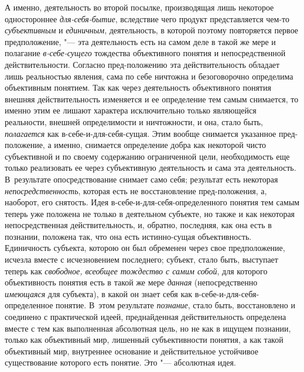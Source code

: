 А именно, деятельность во второй посылке, производящая лишь
некоторое одностороннее
{\em для-себя-бытие},
вследствие чего продукт представляется чем-то
{\em субъективным} и
{\em единичным},
деятельность, в которой поэтому повторяется первое
предположение, "--- эта деятельность есть на самом деле в такой
же мере и полагание {\em в-себе-сущего}
тождества объективного понятия и непосредственной
действительности. Согласно пред-положению эта действительность
обладает лишь реальностью явления, сама по себе ничтожна и безоговорочно
определима объективным понятием. Так как через деятельность объективного
понятия внешняя действительность изменяется и ее определение тем самым
снимается, то именно этим ее лишают характера исключительно только
являющейся реальности, внешней определимости и ничтожности, и она, стало
быть, {\em полагается}
как в-себе-и-для-себя-сущая. Этим вообще снимается указанное
пред-положение, а именно, снимается определение добра как некоторой чисто
субъективной и по своему содержанию ограниченной цели, необходимость еще
только реализовать ее через субъективную деятельность и сама эта
деятельность. В~результате опосредствование снимает само себя; результат
есть некоторая
{\em непосредственность},
которая есть не восстановление пред-положения, а, наоборот,
его снятость. Идея в-себе-и-для-себя-определенного понятия тем самым теперь
уже положена не только в деятельном субъекте, но также и как некоторая
непосредственная действительность, и, обратно, последняя, как она есть в
познании, положена так, что она есть истинно-сущая объективность.
Единичность субъекта, которою он был обременен через свое предположение,
исчезла вместе с исчезновением последнего; субъект, стало быть, выступает
теперь как {\em свободное, всеобщее
тождество с самим собой}, для которого объективность понятия
есть в такой же мере {\em данная}
(непосредственно
{\em имеющаяся} для
субъекта), в какой он знает себя как в-себе-и-для-себя-определенное
понятие. В~этом результате
{\em познание}, стало
быть, восстановлено и соединено с практической идеей,
преднайденная действительность определена вместе с тем как выполненная
абсолютная цель, но не как в ищущем познании, только как объективный мир,
лишенный субъективности понятия, а как такой объективный мир, внутреннее
основание и действительное устойчивое существование которого есть понятие.
Это "--- абсолютная идея.

